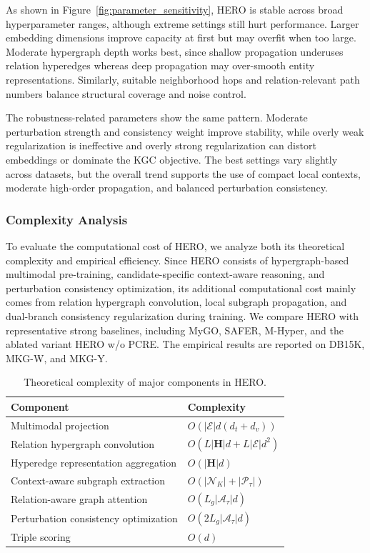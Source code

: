 \documentclass[a4paper,fleqn]{cas-sc}
\begin{document}
As shown in Figure~\ref{fig:parameter_sensitivity}, HERO is stable across broad hyperparameter ranges, although extreme settings still hurt performance. Larger embedding dimensions improve capacity at first but may overfit when too large. Moderate hypergraph depth works best, since shallow propagation underuses relation hyperedges whereas deep propagation may over-smooth entity representations. Similarly, suitable neighborhood hops and relation-relevant path numbers balance structural coverage and noise control.

The robustness-related parameters show the same pattern. Moderate perturbation strength and consistency weight improve stability, while overly weak regularization is ineffective and overly strong regularization can distort embeddings or dominate the KGC objective. The best settings vary slightly across datasets, but the overall trend supports the use of compact local contexts, moderate high-order propagation, and balanced perturbation consistency.


\subsubsection{Complexity Analysis}

To evaluate the computational cost of HERO, we analyze both its theoretical complexity and empirical efficiency. Since HERO consists of hypergraph-based multimodal pre-training, candidate-specific context-aware reasoning, and perturbation consistency optimization, its additional computational cost mainly comes from relation hypergraph convolution, local subgraph propagation, and dual-branch consistency regularization during training. We compare HERO with representative strong baselines, including MyGO, SAFER, M-Hyper, and the ablated variant HERO w/o PCRE. The empirical results are reported on DB15K, MKG-W, and MKG-Y.

\begin{table}[t]
\centering
\caption{Theoretical complexity of major components in HERO.}
\label{tab:theoretical_complexity}
\begin{tabular}{ll}
\toprule
\textbf{Component} & \textbf{Complexity} \\
\midrule
Multimodal projection & $O(|\mathcal{E}|d(d_t+d_v))$ \\
Relation hypergraph convolution & $O(L|\mathbf{H}|d + L|\mathcal{E}|d^2)$ \\
Hyperedge representation aggregation & $O(|\mathbf{H}|d)$ \\
Context-aware subgraph extraction & $O(|\mathcal{N}_{K}| + |\mathcal{P}_{\tau}|)$ \\
Relation-aware graph attention & $O(L_g|\mathcal{A}_{\tau}|d)$ \\
Perturbation consistency optimization & $O(2L_g|\mathcal{A}_{\tau}|d)$ \\
Triple scoring & $O(d)$ \\
\bottomrule
\end{tabular}
\end{table}
\end{document}
